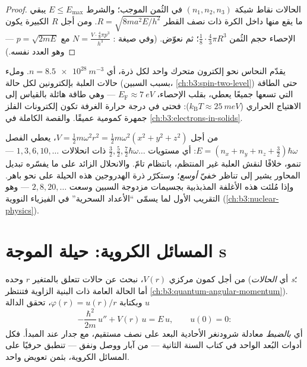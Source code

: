 \begin{proof}
الحالات نقاط شبكة $(n_1, n_2, n_3)$ في الثُمن الموجب؛
والشرط $E \le E_{\max}$ يبقي ما يقع منها داخل الكرة ذات نصف القطر $R =
\sqrt{8ma^2E/h^2}$. ومن أجل $R$ الكبيرة يكون الإحصاء حجم الثُمن
$\tfrac18\cdot\tfrac43\pi R^3$؛ ثم نعوّض. (وفي صيغة :
$N = \tfrac{V\cdot\frac43\pi p^3}{h^3}$ مع $p = \sqrt{2mE}$ ---
وهو العدد نفسه.)
\end{proof}

\begin{example}\label{ex:b3:schrodinger-three-dimensions:metal}
يقدّم النحاس نحو إلكترون متحرك واحد لكل ذرة، أي $n =
\qty{8.5e28}{m^{-3}}$. وملء حالات العلبة بإلكترونين لكل حالة
(بسبب السبين، \cref{ch:b3:spin-two-level}) حتى الطاقة التي
تسعها جميعًا يعطي، بقلب الإحصاء، $E_{\text{F}}
\approx \qty{7}{eV}$ --- وهي طاقة هائلة بالقياس إلى الاهتياج
الحراري ($k_{\text{B}}T \approx \qty{25}{meV}$): فحتى في درجة حرارة
الغرفة تكون إلكترونات الفلز جمهرة كمومية عميقًا. والقصة
الكاملة في \cref{ch:b3:electrons-in-solids}.
\end{example}

\begin{example}\label{ex:b3:schrodinger-three-dimensions:oscillator}
من أجل $V = \tfrac12 m\omega^2r^2 = \tfrac12 m\omega^2(x^2 + y^2 +
z^2)$، يعطي الفصل $E = (n_x + n_y + n_z + \tfrac32)\hbar\omega$:
أي مستويات $\tfrac32, \tfrac52, \tfrac72\hbar\omega\ldots$ ذات
انحلالات $1, 3, 6, 10, \dots$ --- تنمو، خلافًا لنقش العلبة
غير المنتظم، بانتظام تامّ. والانحلال الزائد على ما يفسّره
تبديل المحاور يشير إلى تناظر خفيّ \emph{أوسع}؛ وستكرّر ذرة
الهدروجين هذه الحيلة على نحو باهر.
وإذا مُلئت هذه الأغلفة المذبذبية بجسيمات مزدوجة السبين وسعت $2,
8, 20, \dots$ --- وهو التقريب الأول لما يسمّى ``الأعداد السحرية'' في
الفيزياء النووية (\cref{ch:b3:nuclear-physics}).
\end{example}

\section{المسائل الكروية: حيلة الموجة s}

\begin{proposition}\label{prop:b3:schrodinger-three-dimensions:swave}
من أجل كمون مركزي $V(r)$، نبحث عن حالات تتعلق بالمتغير $r$ وحده
(أي \emph{الحالات s}؛ أما الحالة العامة ذات البنية الزاوية
فتنتظر \cref{ch:b3:quantum-angular-momentum}). وبكتابة
$\varphi(r) = u(r)/r$، تحقق الدالة $u$
\[
-\frac{\hbar^2}{2m}\,u'' + V(r)\,u = E\,u ,
\qquad u(0) = 0 :
\]
أي \emph{بالضبط} معادلة شرودنغر الأحادية البعد على
نصف مستقيم، مع جدار عند المبدأ. فكل أدوات البُعد الواحد في كتاب
السنة الثانية --- من آبار ووصل ونفق --- تنطبق حرفيًا على
المسائل الكروية، بثمن تعويض واحد.
\end{proposition}

